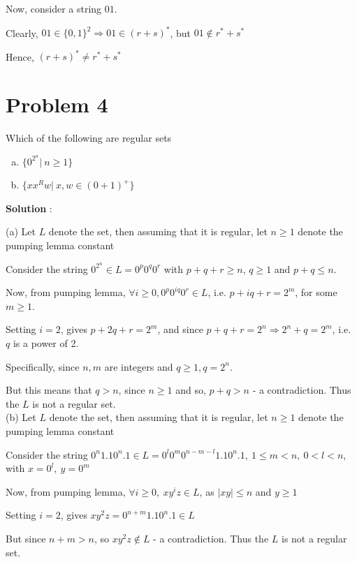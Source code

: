 \documentclass{article}
\begin{document}
    Now, consider a string $01$.
    
    Clearly, $01 \in \{0, 1 \}^2 \Rightarrow 01 \in (r + s)^*$, but $01 \notin r^* + s^*$
 
    Hence, $(r+s)^* \neq  r^* + s^*$
    
    
    \section*{Problem 4} Which of the following are regular sets
    \begin{enumerate}[(a)]
        \item $\{ 0^{2^n} |~ n \geq 1\}$
        \item $\{ xx^Rw |~ x, w \in (0 + 1)^+ \}$
    \end{enumerate}
    
    \textbf{Solution} : 

    (a) Let $L$ denote the set, then assuming that it is regular, let $n \geq 1$ denote the pumping lemma constant

    \quad Consider the string $0^{2^n} \in L = 0^{p}0^{q}0^{r}$ with $p + q + r \geq n$, $q \geq 1$ and $p + q \leq n$. 
    
    \quad Now, from pumping lemma, $\forall i \geq 0,0 ^{p}0^{iq}0^{r} \in L$, i.e. $p + iq + r = 2^m$, for some $m \geq 1$. 
    
    \quad Setting $i = 2$, gives $p + 2q + r = 2^m$, and since $p + q + r = 2^n \Rightarrow 2^n + q = 2^m$, i.e. $q$ is a power of 2. 
    
    \quad Specifically, since $n, m$ are integers and $q \geq 1, q = 2^n$.
    
    \quad But this means that $q > n$, since $n \geq 1$
    and so, $p + q > n$  - a contradiction. Thus the $L$ is not a regular set.\\
    
    (b) Let $L$ denote the set, then assuming that it is regular, let $n \geq 1$ denote the pumping lemma constant
    
    \quad Consider the string $0^n1.10^n.1 \in L = 0^{l}0^{m}0^{n - m - l}1.10^n.1, ~1 \leq m < n, ~0 < l < n$, with $x = 0^l, ~ y = 0^{m}$
    
    \quad Now, from pumping lemma, $\forall i \geq 0, ~xy^iz \in L$, as $|xy| \leq n$ and $y \geq 1$

    \quad Setting $i = 2$, gives $xy^2z = 0^{n + m}1.10^n.1 \in L$ 
    
    \quad But since $n + m > n$, so $xy^2z \notin L$ - a contradiction. Thus the $L$ is not a regular set. \\
\end{document}

